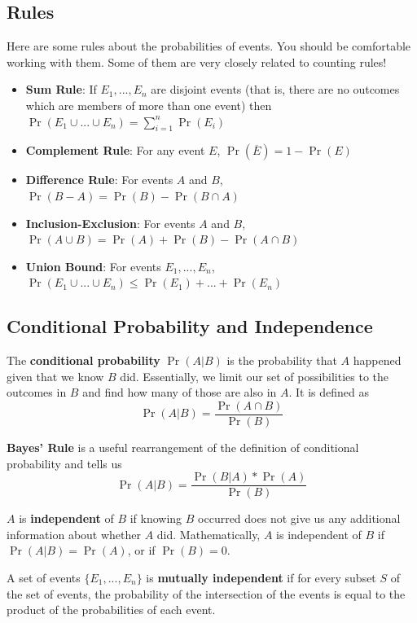 \documentclass[12pt,letterpaper]{article}
\begin{document}
\subsection{Rules}

Here are some rules about the probabilities of events. You should be comfortable working with them. Some of them are very closely related to counting rules!

\begin{itemize}
    \item \textbf{Sum Rule}: If $E_1,...,E_n$ are disjoint events (that is, there are no outcomes which are members of more than one event) then $\Pr(E_1 \cup ... \cup E_n) = \sum_{i=1}^{n} \Pr(E_i)$
    \item \textbf{Complement Rule}: For any event $E$, $\Pr(\overline{E}) = 1 - \Pr(E)$
    \item \textbf{Difference Rule}: For events $A$ and $B$, $\Pr(B - A) = \Pr(B) - \Pr(B \cap A)$
    \item \textbf{Inclusion-Exclusion}: For events $A$ and $B$, $\Pr(A \cup B) = \Pr(A) + \Pr(B) - \Pr(A \cap B)$
    \item \textbf{Union Bound}: For events $E_1,...,E_n$, $\Pr(E_1 \cup ... \cup E_n) \leq \Pr(E_1) + ... + \Pr(E_n)$
\end{itemize}

\subsection{Conditional Probability and Independence}

The \textbf{conditional probability} $\Pr(A | B)$ is the probability that $A$ happened given that we know $B$ did. Essentially, we limit our set of possibilities to the outcomes in $B$ and find how many of those are also in $A$. It is defined as $$\Pr(A | B) = \frac{\Pr(A \cap B)}{\Pr(B)}$$

\textbf{Bayes' Rule} is a useful rearrangement of the definition of conditional probability and tells us $$\Pr(A | B) = \frac{\Pr(B | A) * \Pr(A)}{\Pr(B)}$$

$A$ is \textbf{independent} of $B$ if knowing $B$ occurred does not give us any additional information about whether $A$ did. Mathematically, $A$ is independent of $B$ if $\Pr(A | B) = \Pr(A)$, or if $\Pr(B)=0$.

A set of events $\{E_1,...,E_n\}$ is \textbf{mutually independent} if for every subset $S$ of the set of events, the probability of the intersection of the events is equal to the product of the probabilities of each event.
\end{document}
